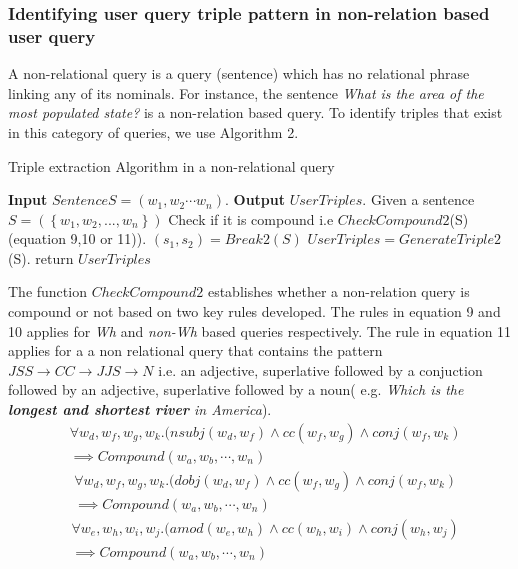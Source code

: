 \documentclass[review]{elsarticle}
\begin{document}
\subsubsection{ Identifying user query triple pattern in non-relation based user query}
A non-relational query is a query (sentence)  which has no relational phrase  linking  any of its nominals. For instance,  the sentence  \textit{What is the area of the most populated state?} is a non-relation based query. To identify triples that exist in this category of queries, we use Algorithm 2.
\begin{algorithm}[H]
\caption{Triple extraction Algorithm in a non-relational query}
\begin{algorithmic}[1]
\STATEx \textbf{Input} $Sentence S=(w_1,w_2\cdots w_n)$.
\STATEx \textbf{Output} $UserTriples$.
\STATE Given a sentence $S=(\left\{w_{1},w_{2},...,w_{n}\right\})$
\STATE Check if it is compound i.e $CheckCompound2$(S) (equation 9,10 or 11)).
\STATE $(s_1,s_2)=Break2(S)$
\ELSE
\STATE $UserTriples=GenerateTriple2$(S).
\ENDIF
\STATE return $UserTriples$
\end{algorithmic}
\end{algorithm}
The function $CheckCompound2$ establishes whether a non-relation query  is compound or not based on two key rules developed. The  rules  in equation 9 and 10 applies for \textit{Wh}  and \textit{non-Wh}  based queries respectively. The rule in equation 11 applies for  a a non relational query that contains the pattern $JSS\rightarrow CC\rightarrow JJS\rightarrow N$ i.e. an adjective, superlative followed by a conjuction followed by an adjective, superlative followed by a noun( e.g. \textit{Which is the\textbf{ longest and shortest river} in America}).
\begin{equation}
\begin{split}
 &\forall  w_d,w_f,w_g,w_k.(nsubj(w_d,w_f)\land cc(w_f,w_g)\land conj(w_f,w_k)\\
 &\implies Compound(w_a,w_b,\cdots,w_n)
 \end{split}
\end{equation}
\begin{equation}
\begin{split}
 &\forall  w_d,w_f,w_g,w_k.(dobj(w_d,w_f)\land cc(w_f,w_g)\land conj(w_f,w_k)\\
 &\implies Compound(w_a,w_b,\cdots,w_n)
 \end{split}
\end{equation}
\begin{equation}
\begin{split}
&\forall  w_e,w_h,w_i,w_j.(amod(w_e,w_h)\land cc(w_h,w_i)\land conj(w_h,w_j)\\
&\implies Compound(w_a,w_b,\cdots,w_n)
\end{split}
\end{equation}
\end{document}
